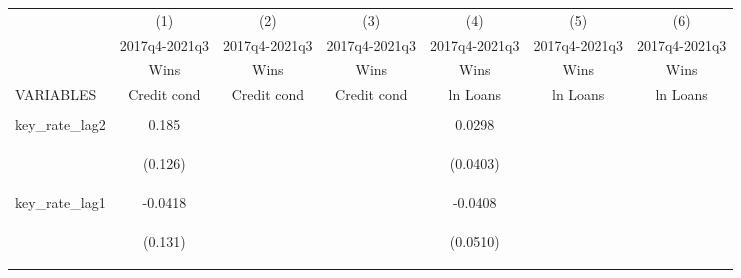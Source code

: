\documentclass[]{article}
\begin{document}
\begin{center}
\begin{tabular}{lcccccc} \hline
 & (1) & (2) & (3) & (4) & (5) & (6) \\
 & 2017q4-2021q3 & 2017q4-2021q3 & 2017q4-2021q3 & 2017q4-2021q3 & 2017q4-2021q3 & 2017q4-2021q3 \\
 & Wins & Wins & Wins & Wins & Wins & Wins \\
VARIABLES & Credit cond & Credit cond & Credit cond & ln Loans & ln Loans & ln Loans \\ \hline
\vspace{4pt} & \begin{footnotesize}\end{footnotesize} & \begin{footnotesize}\end{footnotesize} & \begin{footnotesize}\end{footnotesize} & \begin{footnotesize}\end{footnotesize} & \begin{footnotesize}\end{footnotesize} & \begin{footnotesize}\end{footnotesize} \\
key\_rate\_lag2 & 0.185 &  &  & 0.0298 &  &  \\
\vspace{4pt} & \begin{footnotesize}(0.126)\end{footnotesize} & \begin{footnotesize}\end{footnotesize} & \begin{footnotesize}\end{footnotesize} & \begin{footnotesize}(0.0403)\end{footnotesize} & \begin{footnotesize}\end{footnotesize} & \begin{footnotesize}\end{footnotesize} \\
key\_rate\_lag1 & -0.0418 &  &  & -0.0408 &  &  \\
\vspace{4pt} & \begin{footnotesize}(0.131)\end{footnotesize} & \begin{footnotesize}\end{footnotesize} & \begin{footnotesize}\end{footnotesize} & \begin{footnotesize}(0.0510)\end{footnotesize} & \begin{footnotesize}\end{footnotesize} & \begin{footnotesize}\end{footnotesize} \\

\end{tabular}
\end{center}
\end{document}
